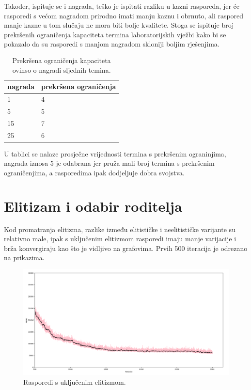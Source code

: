 \documentclass[times, utf8, zavrsni]{fer}
\begin{document}
Također, ispituje se i nagrada, teško je ispitati razliku u kazni rasporeda, jer će rasporedi s većom nagradom prirodno imati manju kaznu i obrnuto, ali raspored manje kazne u tom slučaju ne mora biti bolje kvalitete. Stoga se ispituje broj prekršenih ograničenja kapaciteta termina laboratorijskih vježbi kako bi se pokazalo da su rasporedi s manjom nagradom skloniji boljim rješenjima.

\begin{table}[htb]
\caption{Prekršena ograničenja kapaciteta ovinso o nagradi sljednih temina.}
\label{tbl:nagrada}
\centering
\begin{tabular}{ll} \hline
nagrada &  prekršena ograničenja\\ \hline
1 & 4  \\
5 & 5 \\
15  & 7 \\
25 & 6 \\ \hline
\end{tabular}
\end{table}

U tablici se nalaze prosječne vrijednosti termina s prekršenim ograninjima, nagrada iznosa 5 je odabrana jer pruža mali broj termina s prekršenim ograničenjima, a rasporedima ipak dodjeljuje dobra svojstva.

\section{Elitizam i odabir roditelja}

Kod promatranja elitizma, razlike između elitističke i neelitističke varijante su relativno male, ipak s uključenim elitizmom rasporedi imaju manje varijacije i brža konvergiraju kao što je vidljivo na grafovima. Prvih 500 iteracija je odrezano na prikazima.

\begin{figure}[htb]
\centering
\includegraphics[width=14cm]{images/usp_elitizam_da.png}
\caption{Rasporedi s uključenim elitizmom.}
\label{fig:usp_elitizam_da}
\end{figure}
\end{document}
